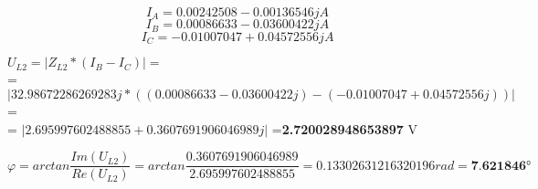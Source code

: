 \[
  I_A = 
  0.00242508 -0.00136546j A
\]
\[
  I_B = 
  0.00086633 -0.03600422j A
\]
\[
  I_C =
 -0.01007047 + 0.04572556j A
\]

  $U_{L2} = |Z_{L2} * (I_B-I_C)|=$\\
  = $|32.98672286269283j*((0.00086633-0.03600422j)-(-0.01007047+0.04572556j))|$=\\
  = $|2.695997602488855+0.3607691906046989j|$
  =\textbf{2.720028948653897} V

  \[
    \varphi = arctan \displaystyle\frac{Im(U_{L2})}{Re(U_{L2})}
    = arctan \displaystyle\frac{0.3607691906046989}{2.695997602488855}
    = 0.13302631216320196rad
    = \textbf{7.621846}\si\degree
  \]

